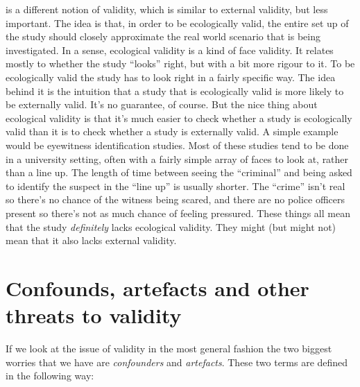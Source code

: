 
 is a different notion of validity, which is similar to external validity, but less important. The idea is that, in order to be ecologically valid, the entire set up of the study should closely approximate the real world scenario that is being investigated. In a sense, ecological validity is a kind of face validity. It relates mostly to whether the study ``looks'' right, but with a bit more rigour to it. To be ecologically valid the study has to look right in a fairly specific way. The idea behind it is the intuition that a study that is ecologically valid is more likely to be externally valid. It's no guarantee, of course. But the nice thing about ecological validity is that it's much easier to check whether a study is ecologically valid than it is to check whether a study is externally valid. A simple example would be eyewitness identification studies. Most of these studies tend to be done in a university setting, often with a fairly simple array of faces to look at, rather than a line up. The length of time between seeing the ``criminal'' and being asked to identify the suspect in the ``line up'' is usually shorter. The ``crime'' isn't real so there's no chance of the witness being scared, and there are no police officers present so there's not as much chance of feeling pressured. These things all mean that the study {\it definitely} lacks ecological validity. They might (but might not) mean that it also lacks external validity.


\section{Confounds, artefacts and other threats to validity}

If we look at the issue of validity in the most general fashion the two biggest worries that we have are {\it confounders} and {\it artefacts}. These two terms are defined in the following way:

